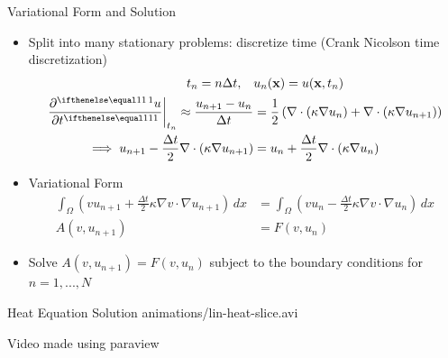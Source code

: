 \documentclass[serif]{beamer}
\begin{document}
\begin{frame}{Variational Form and Solution}
    \begin{itemize}
				\item Split into many stationary problems: discretize time (Crank Nicolson time discretization)
        \[\begin{split}
            t_n = n\Delta t, \quad & u_n(\vec x) = u(\vec x, t_n) \\
            \left.\pder{u}{t}\right|_{t_n} \approx \frac{u_{n+1} - u_n}{\Delta t} & = 
            \frac{1}{2} \left(\nabla \cdot (\kappa \nabla u_n) + \nabla \cdot (\kappa \nabla u_{n+1})\right)\\
            \implies u_{n+1} - \frac{\Delta t}{2} \nabla \cdot (\kappa \nabla u_{n+1}) & = 
            u_n + \frac{\Delta t}{2} \nabla \cdot (\kappa \nabla u_n)
        \end{split}\]

        \item Variational Form
        \[\begin{split}
					\int_\Omega \left(v u_{n+1} + \frac{\Delta t}{2} \kappa \nabla v \cdot \nabla u_{n+1}\right) \, dx & = 
					\int_\Omega \left(vu_n - \frac{\Delta t}{2} \kappa \nabla v \cdot \nabla u_n \right) \, dx \\
					A(v, u_{n+1}) & = F(v, u_n)
				\end{split}\]
        
        \item Solve $A(v, u_{n+1}) = F(v, u_n)$ subject to the boundary conditions
					for $n = 1, ..., N$
    \end{itemize}
\end{frame}

\begin{frame}{Heat Equation Solution}
		\centering
		{animations/lin-heat-slice.avi}

		Video made using paraview
\end{frame}
\end{document}
